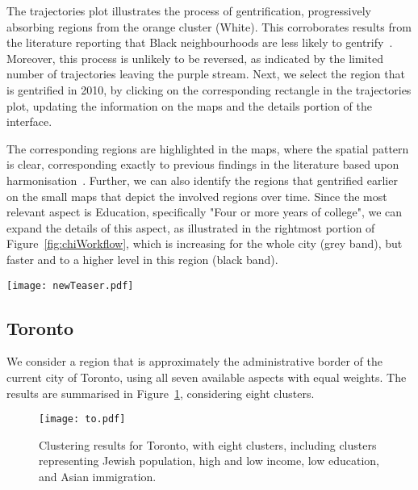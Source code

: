 The trajectories plot illustrates the process of gentrification, progressively
absorbing regions from the orange cluster (White). This corroborates results
from the literature reporting that Black neighbourhoods are less likely to
gentrify~\citep{Hwang2014}. Moreover, this process is unlikely to be reversed, as
indicated by the limited number of trajectories leaving the purple stream. Next,
we select the region that is gentrified in 2010, by clicking on the
corresponding rectangle in the trajectories plot, updating the information on
the maps and the details portion of the interface.

The corresponding regions are highlighted in the maps, where the spatial pattern
is clear, corresponding exactly to previous findings in the literature based
upon harmonisation~\citep{Hwang2014}. Further, we can also identify the regions
that gentrified earlier on the small maps that depict the involved regions over
time. Since the most relevant aspect is Education, specifically "Four or more
years of college", we can expand the details of this aspect, as illustrated in
the rightmost portion of Figure~\ref{fig:chiWorkflow}, which is increasing for
the whole city (grey band), but faster and to a higher level in this region
(black band).



\begin{figure*}
    \centering
 \texttt{[image: newTeaser.pdf]}
 \caption{Workflow to discover gentrification in Chicago: the purple cluster
 corresponds to high education / income. Its population is increasing over time,
 absorbing from the majority White cluster (orange). By selecting the purple
 cluster in 2010, the region is highlighted in the maps. The proportion of
 people with 4+ years of college is increasing in the whole city (grey IQRs),
 but significantly more in this region (black).\label{fig:chiWorkflow}}
\end{figure*}



\subsection{Toronto}

We consider a region that is approximately the administrative border of the
current city of Toronto, using all seven available aspects with equal weights.
The results are summarised in Figure~\ref{fig:to}, considering eight clusters.

\begin{figure}
    \centering 
    \texttt{[image: to.pdf]}
    \caption{Clustering results for Toronto, with eight clusters, including
    clusters representing Jewish population, high and low income, low education,
    and Asian immigration.\label{fig:to}}
\end{figure}

